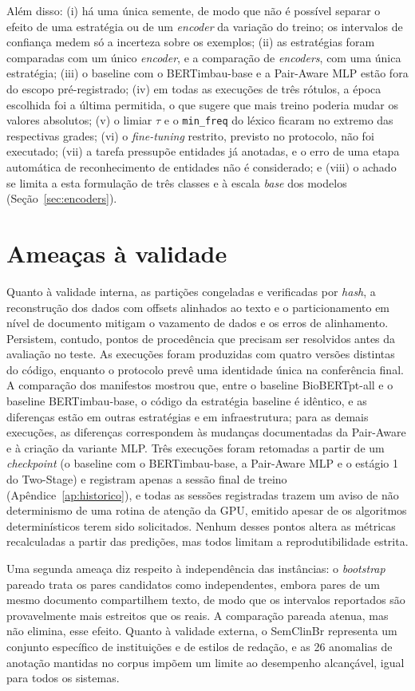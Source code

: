 Além disso: (i) há uma única semente, de modo que não é possível separar o
efeito de uma estratégia ou de um \emph{encoder} da variação do treino; os
intervalos de confiança medem só a incerteza sobre os exemplos; (ii) as estratégias
foram comparadas com um único \emph{encoder}, e a comparação de
\emph{encoders}, com uma única estratégia; (iii) o baseline com o BERTimbau-base e a
Pair-Aware MLP estão fora do escopo pré-registrado; (iv) em todas as
execuções de três rótulos, a época escolhida foi a última permitida, o que
sugere que mais treino poderia mudar os valores absolutos; (v) o limiar $\tau$ e o
\texttt{min\_freq} do léxico ficaram no extremo das respectivas grades; (vi)
o \emph{fine-tuning} restrito, previsto no protocolo, não foi executado; (vii) a tarefa
pressupõe entidades já anotadas, e o erro de uma etapa automática de
reconhecimento de entidades não é considerado; e (viii) o achado se limita a esta
formulação de três classes e à escala \emph{base} dos modelos
(Seção~\ref{sec:encoders}).

\section{Ameaças à validade}

Quanto à validade interna, as partições congeladas e verificadas por
\emph{hash}, a reconstrução dos dados com offsets alinhados ao texto e o
particionamento em nível de documento mitigam o vazamento de dados e os erros de
alinhamento. Persistem, contudo, pontos de procedência que precisam ser resolvidos
antes da avaliação no teste. As execuções foram produzidas com quatro
versões distintas do código, enquanto o protocolo prevê uma identidade única na
conferência final. A comparação dos manifestos mostrou que, entre o baseline
BioBERTpt-all e o baseline BERTimbau-base, o código da estratégia baseline é idêntico, e as
diferenças estão em outras estratégias e em infraestrutura; para as demais
execuções, as diferenças correspondem às mudanças documentadas da Pair-Aware e à
criação da variante MLP. Três execuções foram retomadas a partir de um
\emph{checkpoint} (o baseline com o BERTimbau-base, a Pair-Aware MLP e o estágio 1
do Two-Stage) e registram apenas a sessão final de treino (Apêndice~\ref{ap:historico}),
e todas as sessões registradas trazem um aviso de não determinismo de uma rotina de
atenção da GPU, emitido apesar de os algoritmos determinísticos terem sido
solicitados. Nenhum desses pontos altera as métricas recalculadas a
partir das predições, mas todos limitam a reprodutibilidade estrita.

Uma segunda ameaça diz respeito à independência das instâncias: o
\emph{bootstrap} pareado trata os pares candidatos como independentes, embora pares
de um mesmo documento compartilhem texto, de modo que os intervalos reportados são
provavelmente mais estreitos que os reais. A comparação pareada atenua, mas não
elimina, esse efeito. Quanto à validade externa, o SemClinBr representa um
conjunto específico de instituições e de estilos de redação, e as 26 anomalias de
anotação mantidas no corpus impõem um limite ao desempenho alcançável, igual para
todos os sistemas.

